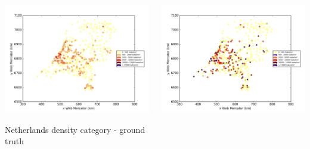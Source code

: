 \documentclass[c]{beamer}
\begin{document}
\begin{frame}
\begin{columns}
 \begin{column}{0.5\textwidth}
  \begin{overlayarea}{\linewidth}{4cm}
    \centering\vfill
    \includegraphics[scale=0.25]{../../data/Pays-Bas/test/Nearest_Neighboors_Classification/Nearest_Neighboors_Classification/density_ground_truth.png}
  \end{overlayarea}
  \begin{overlayarea}{\linewidth}{0.5cm}
    \centering
    \tiny Netherlands density category - ground truth\par
  \end{overlayarea}
 \end{column}
 \begin{column}{0.5\textwidth}
  \begin{overlayarea}{\linewidth}{4cm}
    \centering\vfill
    \includegraphics[scale=0.25]{../../data/Pays-Bas/test/Nearest_Neighboors_Classification/Nearest_Neighboors_Classification/density_classification.png}

\end{overlayarea}
\end{column}
\end{columns}
\end{frame}
\end{document}

